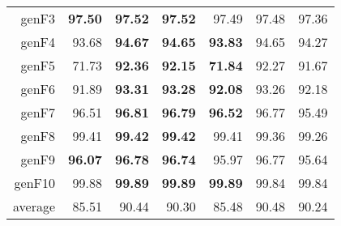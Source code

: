 \begin{table}
\begin{tabular}{|r||r|r|r||r|r|r|}
{\sc genF3} & \textbf{97.50} & \textbf{97.52} & \textbf{97.52} & 97.49 & 97.48 & 97.36 \\
{\sc genF4} & 93.68 & \textbf{94.67} & \textbf{94.65} & \textbf{93.83} & 94.65 & 94.27 \\
{\sc genF5} & 71.73 & \textbf{92.36} & \textbf{92.15} & \textbf{71.84} & 92.27 & 91.67 \\
{\sc genF6} & 91.89 & \textbf{93.31} & \textbf{93.28} & \textbf{92.08} & 93.26 & 92.18 \\
{\sc genF7} & 96.51 & \textbf{96.81} & \textbf{96.79} & \textbf{96.52} & 96.77 & 95.49 \\
{\sc genF8} & 99.41 & \textbf{99.42} & \textbf{99.42} & 99.41 & 99.36 & 99.26 \\
{\sc genF9} & \textbf{96.07} & \textbf{96.78} & \textbf{96.74} & 95.97 & 96.77 & 95.64 \\
{\sc genF10} & 99.88 & \textbf{99.89} & \textbf{99.89} & \textbf{99.89} & 99.84 & 99.84 \\
\hline
average & 85.51 & 90.44 & 90.30 & 85.48 & 90.48 & 90.24 \\
\hline
\end{tabular}
\end{table}

